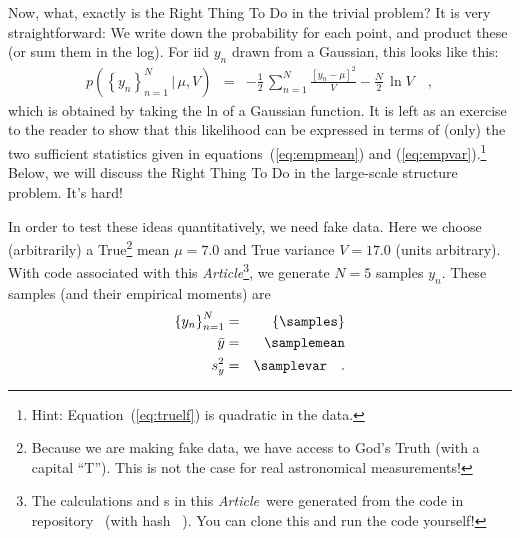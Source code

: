 \documentclass[12pt, letterpaper, preprint]{aastex}
\newcommand{\setof}[1]{\left\{{#1}\right\}}
\newcommand{\given}{\,|\,}
\newcommand{\documentname}{\textsl{Article}}
\begin{document}
Now, what, exactly is the Right Thing To Do in the trivial problem?
It is very straightforward:
We write down the probability for each point, and product these
(or sum them in the log).
For iid $y_n$ drawn from a Gaussian, this looks like this:
\begin{eqnarray}
p(\setof{y_n}_{n=1}^N\given \mu,V) &=& -\frac{1}{2}\,\sum_{n=1}^N \frac{[y_n - \mu]^2}{V} - \frac{N}{2}\,\ln V
\label{eq:truelf}\quad ,
\end{eqnarray}
which is obtained by taking the ln of a Gaussian function.
It is left as an exercise to the reader to show that this likelihood
can be expressed in terms of (only) the two sufficient statistics given
in equations~(\ref{eq:empmean}) and (\ref{eq:empvar}).\footnote{Hint:
  Equation~(\ref{eq:truelf}) is quadratic in the data.}
Below, we will discuss the Right Thing To Do in the large-scale
structure problem. It's hard!

In order to test these ideas quantitatively, we need fake data.
Here we choose (arbitrarily) a True\footnote{Because we are making
  fake data, we have access to God's Truth (with a capital
  ``T''). This is not the case for real astronomical measurements!}
mean $\mu=7.0$ and True variance $V=17.0$ (units arbitrary).
With code associated with this \documentname\footnote{The calculations
  and \figurename s in this \documentname\ were generated from the code in
  repository \giturl\ (with hash \texttt{\githash~\gitdate}). You can
  clone this and run the code yourself!}, we generate $N=5$ samples
$y_n$.
These samples (and their empirical moments) are
\begin{eqnarray}
\setof{y_n}_{n=1}^N &=& \setof{\samples}
\\
\bar{y} &=& \samplemean
\\
s^2_y &=& \samplevar
\quad .
\end{eqnarray}
\end{document}

